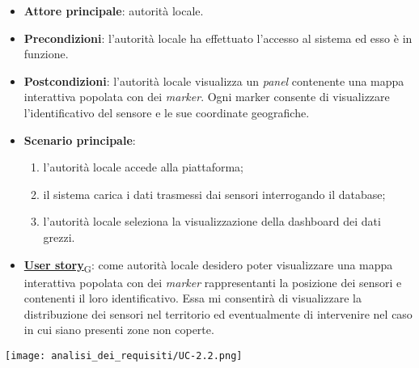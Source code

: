 \begin{itemize}
	\item \textbf{Attore principale}: autorità locale.
	\item \textbf{Precondizioni}: l'autorità locale ha effettuato l'accesso al sistema ed esso è in funzione.
	\item \textbf{Postcondizioni}: l'autorità locale visualizza un \textit{panel} contenente una mappa interattiva
	      popolata con dei \textit{marker}. Ogni marker consente di visualizzare l'identificativo del sensore e le sue coordinate geografiche.
	\item \textbf{Scenario principale}:
	      \begin{enumerate}
		      \item l'autorità locale accede alla piattaforma;
		      \item il sistema carica i dati trasmessi dai sensori interrogando il database;
		      \item l'autorità locale seleziona la visualizzazione della dashboard dei dati grezzi.
	      \end{enumerate}
	\item \href{https://7last.github.io/docs/rtb/documentazione-interna/glossario\#user-story}{\textbf{User story}\textsubscript{G}}: come autorità locale desidero poter visualizzare una mappa interattiva popolata con dei \textit{marker} rappresentanti
	      la posizione dei sensori e contenenti il loro identificativo. Essa mi consentirà di visualizzare la distribuzione dei sensori nel territorio
	      ed eventualmente di intervenire nel caso in cui siano presenti zone non coperte.
\end{itemize}
\begin{center}
	\texttt{[image: analisi\_dei\_requisiti/UC-2.2.png]}
\end{center}


